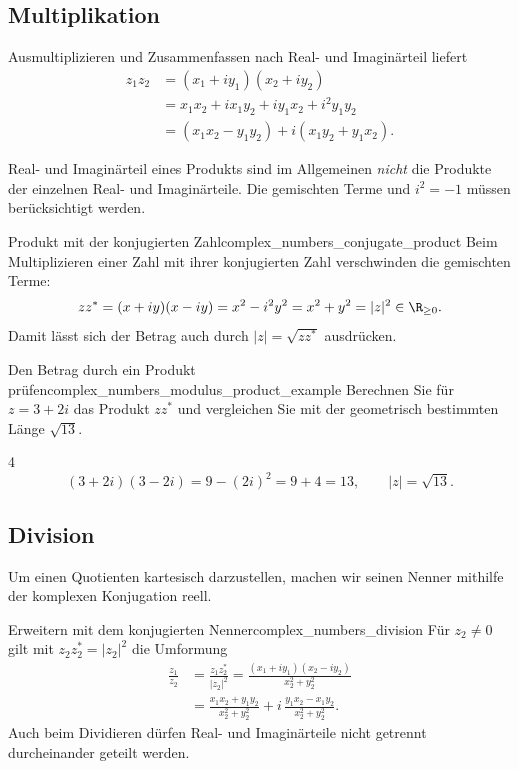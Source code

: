 \subsection{Multiplikation}
Ausmultiplizieren und Zusammenfassen nach Real- und Imaginärteil liefert
\[
  \begin{aligned}
    z_1z_2&=(x_1+iy_1)(x_2+iy_2)\\[5pt]
      &=x_1x_2+ix_1y_2+iy_1x_2+i^2y_1y_2\\[5pt]
      &=(x_1x_2-y_1y_2)+i(x_1y_2+y_1x_2).
  \end{aligned}
\]
\begin{RemarkBox}[remark title=Gemischte Terme bei der Multiplikation]
  Real- und Imaginärteil eines Produkts sind im Allgemeinen \emph{nicht}
  die Produkte der einzelnen Real- und Imaginärteile. Die gemischten
  Terme und $i^2=-1$ müssen berücksichtigt werden.
\end{RemarkBox}
\begin{KeyPointBox}{Produkt mit der konjugierten Zahl}{complex_numbers_conjugate_product}
  Beim Multiplizieren einer Zahl mit ihrer konjugierten Zahl verschwinden
  die gemischten Terme:
  \[
    zz^*=(x+iy)(x-iy)=x^2-i^2y^2=x^2+y^2=|z|^2\in\R_{\ge0}.
  \]
  Damit lässt sich der Betrag auch durch $|z|=\sqrt{zz^*}$ ausdrücken.
\end{KeyPointBox}
\begin{ExampleBox}{Den Betrag durch ein Produkt prüfen}{complex_numbers_modulus_product_example}
  Berechnen Sie für $z=3+2i$ das Produkt $zz^*$ und vergleichen Sie
  mit der geometrisch bestimmten Länge $\sqrt{13}$.
  \begin{ClozeArea}{4}
    \[
      (3+2i)(3-2i)=9-(2i)^2=9+4=13,
      \qquad |z|=\sqrt{13}.
    \]
  \end{ClozeArea}
\end{ExampleBox}

\clearpage
\subsection{Division}
Um einen Quotienten kartesisch darzustellen, machen wir seinen Nenner
mithilfe der komplexen Konjugation reell.
\begin{KeyPointBox}{Erweitern mit dem konjugierten Nenner}{complex_numbers_division}
  Für $z_2\ne0$ gilt mit $z_2z_2^*=|z_2|^2$ die Umformung
  \[
    \begin{aligned}
      \frac{z_1}{z_2}
        &=\frac{z_1z_2^*}{|z_2|^2}
         =\frac{(x_1+iy_1)(x_2-iy_2)}{x_2^2+y_2^2}\\[7pt]
        &=\frac{x_1x_2+y_1y_2}{x_2^2+y_2^2}
          +i\,\frac{y_1x_2-x_1y_2}{x_2^2+y_2^2}.
    \end{aligned}
  \]
  Auch beim Dividieren dürfen Real- und Imaginärteile nicht getrennt
  durcheinander geteilt werden.
\end{KeyPointBox}

